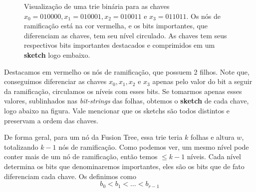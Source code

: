\begin{figure}[h!]
\caption{Visualização de uma trie binária para as chaves
$x_0=010000,x_1=010001,x_2=010011$ e $x_3=011011$. Os nós de ramificação está na
cor vermelha, e os bits importantes, que diferenciam as chaves, tem seu nível
circulado. As chaves tem seus respectivos bits importantes destacados e
comprimidos em um \textbf{sketch} logo embaixo.\label{f:fusion-trie}}
\end{figure}

Destacamos em vermelho os nós de ramificação, que possuem 2 filhos. Note que,
conseguimos diferenciar as chaves $x_0,x_1,x_2$ e $x_3$ apenas pelo valor do bit
a seguir da ramificação, circulamos os níveis com esses bits. Se tomarmos apenas
esses valores, sublinhados nas \textit{bit-strings} das folhas, obtemos o
\textbf{sketch} de cada chave, logo abaixo na figura. Vale mencionar que os
sketchs são todos distintos e preservam a ordem das chaves.

De forma geral, para um nó da Fusion Tree, essa trie teria $k$ folhas e altura
$w$, totalizando $k-1$ nós de ramificação. Como podemos ver, um mesmo nível pode
conter mais de um nó de ramificação, então temos $\leq k-1$ níveis. Cada nível
determina os bits que denominaremos importantes, eles são os bits que de fato
diferenciam cada chave. Os definimos como
\[
b_0<b_1<\dots <b_{r-1}
\]

